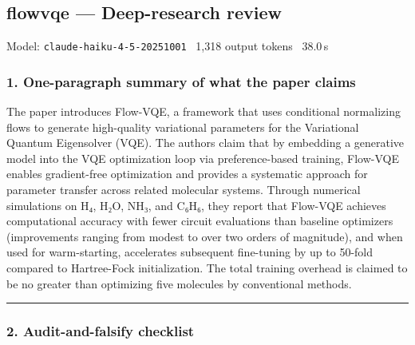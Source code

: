 \documentclass[10pt,letterpaper]{article}
\begin{document}
\subsection{flowvqe --- Deep-research review}
\noindent\textcolor{muted}{\small Model: \texttt{claude-haiku-4-5-20251001} \textperiodcentered\ 1,318 output tokens \textperiodcentered\ 38.0\,s}

\hypertarget{one-paragraph-summary-of-what-the-paper-claims}{%
\subsubsection{1. One-paragraph summary of what the paper claims}\label{one-paragraph-summary-of-what-the-paper-claims}}

The paper introduces Flow-VQE, a framework that uses conditional normalizing flows to generate high-quality variational parameters for the Variational Quantum Eigensolver (VQE). The authors claim that by embedding a generative model into the VQE optimization loop via preference-based training, Flow-VQE enables gradient-free optimization and provides a systematic approach for parameter transfer across related molecular systems. Through numerical simulations on H₄, H₂O, NH₃, and C₆H₆, they report that Flow-VQE achieves computational accuracy with fewer circuit evaluations than baseline optimizers (improvements ranging from modest to over two orders of magnitude), and when used for warm-starting, accelerates subsequent fine-tuning by up to 50-fold compared to Hartree-Fock initialization. The total training overhead is claimed to be no greater than optimizing five molecules by conventional methods.

\begin{center}\rule{0.5\linewidth}{0.5pt}\end{center}

\hypertarget{audit-and-falsify-checklist}{%
\subsubsection{2. Audit-and-falsify checklist}\label{audit-and-falsify-checklist}}
\end{document}
